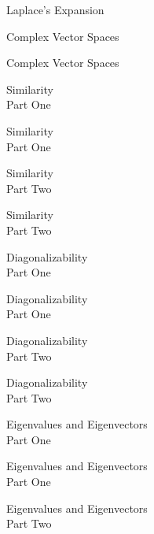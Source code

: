 \documentclass{titlescreen}
\begin{document}
\begin{videotitle}
  Laplace's Expansion
\end{videotitle}
\begin{videoend}
  Complex Vector Spaces
\end{videoend}




\begin{videotitle}
  Complex Vector Spaces  
\end{videotitle}
\begin{videoend}
  Similarity \\[1ex]
  Part One
\end{videoend}

\begin{videotitle}
  Similarity \\[1ex]
  Part One
\end{videotitle}
\begin{videoend}
  Similarity \\[1ex]
  Part Two
\end{videoend}

\begin{videotitle}
  Similarity \\[1ex]
  Part Two
\end{videotitle}
\begin{videoend}
  Diagonalizability \\[1ex]
  Part One
\end{videoend}

\begin{videotitle}
  Diagonalizability \\[1ex]
  Part One
\end{videotitle}
\begin{videoend}
  Diagonalizability \\[1ex]
  Part Two
\end{videoend}

\begin{videotitle}
  Diagonalizability \\[1ex]
  Part Two
\end{videotitle}
\begin{videoend}
  Eigenvalues and Eigenvectors \\[1ex]
  Part One
\end{videoend}

\begin{videotitle}
  Eigenvalues and Eigenvectors \\[1ex]
  Part One
\end{videotitle}
\begin{videoend}
  Eigenvalues and Eigenvectors \\[1ex]
  Part Two
\end{videoend}
\end{document}
